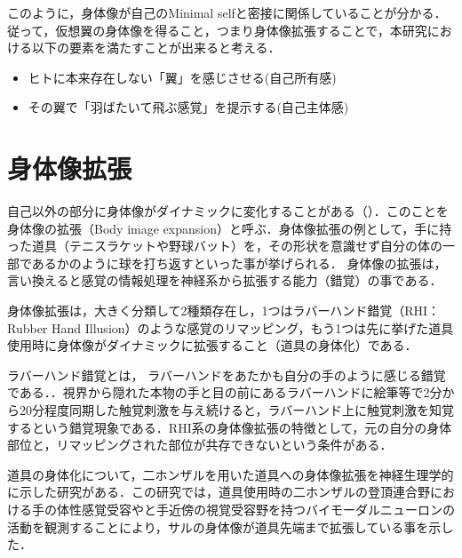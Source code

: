    このように，身体像が自己のMinimal selfと密接に関係していることが分かる．従って，仮想翼の身体像を得ること，つまり身体像拡張することで，本研究における以下の要素を満たすことが出来ると考える．

    \begin{itemize}
        \item ヒトに本来存在しない「翼」を感じさせる(自己所有感)
        \item その翼で「羽ばたいて飛ぶ感覚」を提示する(自己主体感)
    \end{itemize}

\section{身体像拡張}
    

    自己以外の部分に身体像がダイナミックに変化することがある（）．このことを身体像の拡張（Body image expansion）と呼ぶ．身体像拡張の例として，手に持った道具（テニスラケットや野球バット）を，その形状を意識せず自分の体の一部であるかのように球を打ち返すといった事が挙げられる\cite{渡辺貴文2005仮想道具による身体像拡張の評価手法に関する研究}．
    身体像の拡張は，言い換えると感覚の情報処理を神経系から拡張する能力（錯覚）の事である．

    身体像拡張は，大きく分類して2種類存在し，1つはラバーハンド錯覚（RHI：Rubber Hand Illusion）\cite{botvinick1998rubber}のような感覚のリマッピング，もう1つは先に挙げた道具使用時に身体像がダイナミックに拡張すること（道具の身体化）である．

    ラバーハンド錯覚とは， ラバーハンドをあたかも自分の手のように感じる錯覚である．．視界から隠れた本物の手と目の前にあるラバーハンドに絵筆等で2分から20分程度同期した触覚刺激を与え続けると，ラバーハンド上に触覚刺激を知覚するという錯覚現象である．RHI系の身体像拡張の特徴として，元の自分の身体部位と，リマッピングされた部位が共存できないという条件がある．

    道具の身体化について，二ホンザルを用いた道具への身体像拡張を神経生理学的に示した研究がある\cite{iriki1996coding}．この研究では，道具使用時の二ホンザルの登頂連合野における手の体性感覚受容やと手近傍の視覚受容野を持つバイモーダルニューロンの活動を観測することにより，サルの身体像が道具先端まで拡張している事を示した．

